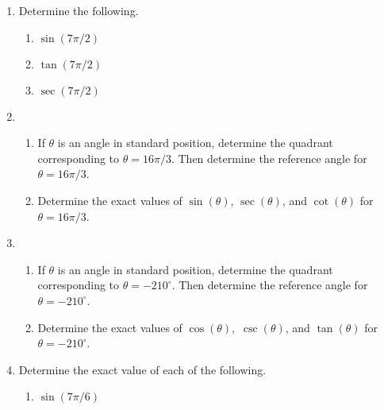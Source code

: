 \begin{enumerate}
\begin{enumerate}
\end{enumerate}
\newpage
\item Determine the following.
\begin{enumerate}
\item $\sin(7\pi/2)$ \\[.7in]
\item $\tan(7\pi/2)$ \\[.7in]
\item $\sec(7\pi/2)$ \\[.7in]
\end{enumerate}


\item \begin{enumerate}
\item If $\theta$ is an angle in standard position, determine the quadrant corresponding to $\theta=16\pi/3$. Then determine the reference angle for $\theta=16\pi/3$. \\[1in]

\item Determine the exact values of $\sin(\theta)$, $\sec(\theta)$, and $\cot(\theta)$ for $\theta=16\pi/3$. \\[1.5in]
\end{enumerate}

\newpage
\item \begin{enumerate}
\item If $\theta$ is an angle in standard position, determine the quadrant corresponding to $\theta=-210^\circ$. Then determine the reference angle for $\theta=-210^\circ$.  \\[1in]

\item Determine the exact values of $\cos(\theta),$ $\csc(\theta)$, and $\tan(\theta)$ for $\theta=-210^\circ$. \\[1in]
\end{enumerate}






\item Determine the exact value of each of the following. %
\begin{enumerate}
\item $\sin(7\pi/6)$ \vfill


\end{enumerate}
\end{enumerate}
